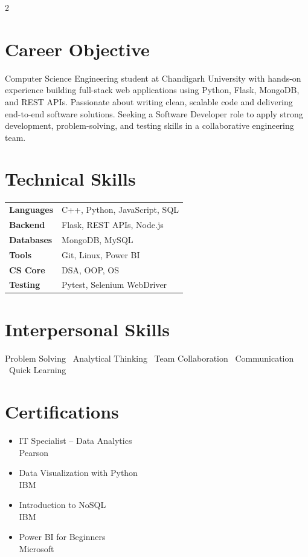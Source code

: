 \documentclass[10pt,a4paper]{article}
\begin{document}
\setlength{\columnsep}{18pt}
\begin{paracol}{2}


\section*{Career Objective}
\small
Computer Science Engineering student at Chandigarh University with hands-on experience building full-stack web applications using Python, Flask, MongoDB, and REST APIs. Passionate about writing clean, scalable code and delivering end-to-end software solutions. Seeking a Software Developer role to apply strong development, problem-solving, and testing skills in a collaborative engineering team.

\section*{Technical Skills}
\small
\begin{tabular}{@{}ll}
  \textbf{Languages}  & C++, Python, JavaScript, SQL \\[2pt]
  \textbf{Backend}    & Flask, REST APIs, Node.js \\[2pt]
  \textbf{Databases}  & MongoDB, MySQL \\[2pt]
  \textbf{Tools}      & Git, Linux, Power BI \\[2pt]
  \textbf{CS Core}    & DSA, OOP, OS \\[2pt]
  \textbf{Testing}    & Pytest, Selenium WebDriver \\
\end{tabular}

\section*{Interpersonal Skills}
\small
Problem Solving \textbullet\ Analytical Thinking \textbullet\ Team Collaboration \textbullet\ Communication \textbullet\ Quick Learning

\section*{Certifications}
\small
\begin{itemize}
  \item IT Specialist -- Data Analytics\\{\footnotesize\color{darkgray}Pearson}
  \item Data Visualization with Python\\{\footnotesize\color{darkgray}IBM}
  \item Introduction to NoSQL\\{\footnotesize\color{darkgray}IBM}
  \item Power BI for Beginners\\{\footnotesize\color{darkgray}Microsoft}
\end{itemize}


\end{paracol}
\end{document}
